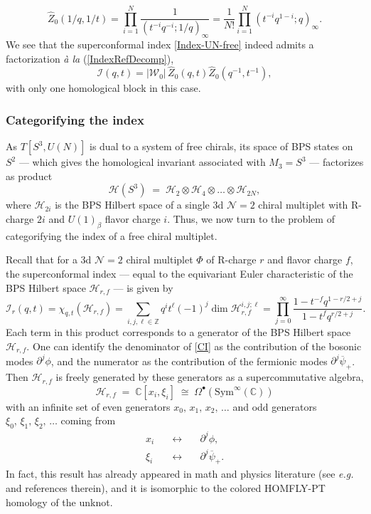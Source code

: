 \documentclass[hyper,letterpaper]{JHEP3}
\newcommand{\bea}{\begin{eqnarray}}
\newcommand{\eea}{\end{eqnarray}}
\newcommand{\be}{\begin{equation}}
\newcommand{\ee}{\end{equation}}
\newcommand{\Z}{{\mathbb Z}}
\newcommand{\C}{{\mathbb C}}
\renewcommand{\bar}{\overline}
\renewcommand{\hat}{\widehat}
\def\CH{{\mathcal H}}
\def\CI{{\mathcal I}}
\def\CN{{\mathcal N}}
\def\CW{{\mathcal W}}
\begin{document}
\begin{equation}
	\hat Z_0(1/q,1/t)=\prod_{i=1}^N\frac{1}{(t^{-i}q^{-i};1/q)_\infty}=
	\frac{1}{N!}\prod_{i=1}^N{(t^{-i}q^{1-i};q)_\infty}.
	\label{S3-anti-block}
\end{equation}
We see that the superconformal index \eqref{Index-UN-free} indeed admits a factorization {\it \`a la} (\ref{IndexRefDecomp}),
\begin{equation}
 \CI(q,t)=|\CW_0|\,\hat{Z}_0(q,t)\hat{Z}_0(q^{-1},t^{-1}),
\end{equation}
with only one homological block in this case.

\subsubsection{Categorifying the index}

As $T[S^3,U(N)]$ is dual to a system of free chirals, its space of BPS states on $S^2$ --- which gives the homological invariant associated with $M_3 = S^3$ --- factorizes as product
\be
\CH (S^3) \; = \; \CH_2 \otimes \CH_4 \otimes \ldots \otimes \CH_{2N},
\ee
where $\CH_{2i}$ is the BPS Hilbert space of a single 3d $\CN=2$ chiral multiplet with R-charge $2i$ and $U(1)_{\beta}$ flavor charge $i$.
Thus, we now turn to the problem of categorifying the index of a free chiral multiplet.

Recall that for a 3d $\CN=2$ chiral multiplet $\Phi$ of R-charge $r$ and flavor charge $f$, the superconformal index --- equal to the equivariant Euler characteristic of the BPS Hilbert space $\CH_{r,f}$ --- is given by
\be
\CI_r (q,t) = \chi_{q,t}(\CH_{r,f})= \sum_{i,j,\ell \in\Z} q^i t^\ell (-1)^j \dim \CH_{r,f}^{i,j;\ell}= \prod_{j=0}^{\infty} \frac{1 - t^{-f}q^{1-r/2+j}}{1-t^f q^{r/2+j}}.
\label{CI}
\ee
Each term in this product corresponds to a generator of the BPS Hilbert space $\CH_{r,f}$. One can identify the denominator of \eqref{CI} as the contribution of the bosonic modes $\partial^j \phi$, and the numerator as the contribution of the fermionic modes $\partial^j \bar \psi_+$. Then $\CH_{r,f}$ is freely generated by these generators as a supercommutative algebra,
\be
\CH_{r,f} \; = \; \C [x_i, \xi_i] \; \cong \; \Omega^{\bullet} (\text{Sym}^{\infty} (\C))
\label{chiralhomology}
\ee
with an infinite set of even generators $x_0, \, x_1, \, x_2, \, \ldots$
and odd generators $\xi_0, \, \xi_1, \, \xi_2, \, \ldots$ coming from
\bea
x_i & \quad \longleftrightarrow \quad & \partial^j \phi, \\
\xi_i & \quad \longleftrightarrow \quad & \partial^j \bar \psi_+. \nonumber
\eea
In fact, this result has already appeared in math and physics literature
(see {\it e.g.}~\cite{Gorsky:2013jxa,Gukov:2016gkn} and references therein), and it is isomorphic to the colored HOMFLY-PT homology of the unknot.
\end{document}
